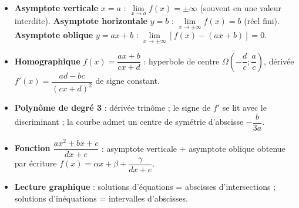 \documentclass[11pt]{article}
\begin{document}
\begin{aretenir}
\begin{itemize}
\item \textbf{Asymptote verticale} $x=a$ : $\lim\limits_{x\to a}f(x)=\pm\infty$ (souvent en une valeur interdite). \textbf{Asymptote horizontale} $y=b$ : $\lim\limits_{x\to\pm\infty}f(x)=b$ (réel fini). \textbf{Asymptote oblique} $y=ax+b$ : $\lim\limits_{x\to\pm\infty}[f(x)-(ax+b)]=0$.
\item \textbf{Homographique} $f(x)=\dfrac{ax+b}{cx+d}$ : hyperbole de centre $\Omega\left(-\dfrac{d}{c};\dfrac{a}{c}\right)$, dérivée $f'(x)=\dfrac{ad-bc}{(cx+d)^2}$ de signe constant.
\item \textbf{Polynôme de degré 3} : dérivée trinôme ; le signe de $f'$ se lit avec le discriminant ; la courbe admet un centre de symétrie d'abscisse $-\dfrac{b}{3a}$.
\item \textbf{Fonction $\dfrac{ax^2+bx+c}{dx+e}$} : asymptote verticale + asymptote oblique obtenue par écriture $f(x)=\alpha x+\beta+\dfrac{\gamma}{dx+e}$.
\item \textbf{Lecture graphique} : solutions d'équations = abscisses d'intersections ; solutions d'inéquations = intervalles d'abscisses.
\end{itemize}
\end{aretenir}
\end{document}
